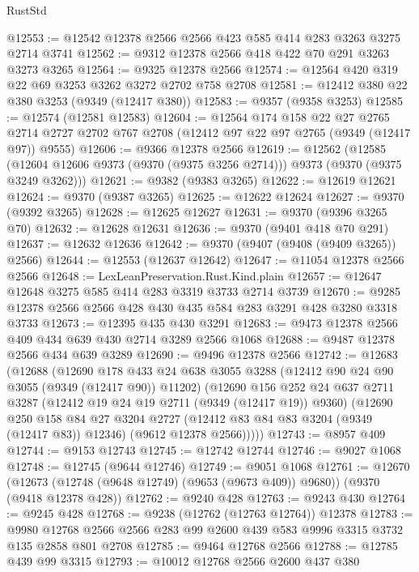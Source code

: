 \begin{lexlean}{RustStd}
\begin{coremodule}
{\begin{coremodule}
{{{{{{{{{{{{{{{{{{{{{{{{{{{{{{{{{{{{{{{@12553 := @12542 @12378 @2566 @2566 @423 @585 @414 @283 @3263 @3275 @2714 @3741
@12562 := @9312 @12378 @2566 @418 @422 @70 @291 @3263 @3273 @3265
@12564 := @9325 @12378 @2566
@12574 := @12564 @420 @319 @22 @69 @3253 @3262 @3272 @2702 @758 @2708
@12581 := @12412 @380 @22 @380 @3253 (@9349 (@12417 @380))
@12583 := @9357 (@9358 @3253)
@12585 := @12574 (@12581 @12583)
@12604 := @12564
    @174
    @158
    @22
    @27
    @2765
    @2714
    @2727
    @2702
    @767
    @2708
    (@12412 @97 @22 @97 @2765 (@9349 (@12417 @97)) @9555)
@12606 := @9366 @12378 @2566
@12619 := @12562
    (@12585 (@12604 @12606 @9373 (@9370 (@9375 @3256 @2714))) @9373 (@9370 (@9375 @3249 @3262)))
@12621 := @9382 (@9383 @3265)
@12622 := @12619 @12621
@12624 := @9370 (@9387 @3265)
@12625 := @12622 @12624
@12627 := @9370 (@9392 @3265)
@12628 := @12625 @12627
@12631 := @9370 (@9396 @3265 @70)
@12632 := @12628 @12631
@12636 := @9370 (@9401 @418 @70 @291)
@12637 := @12632 @12636
@12642 := @9370 (@9407 (@9408 (@9409 @3265)) @2566)
@12644 := @12553 (@12637 @12642)
@12647 := @11054 @12378 @2566 @2566
@12648 := LexLeanPreservation.Rust.Kind.plain
@12657 := @12647 @12648 @3275 @585 @414 @283 @3319 @3733 @2714 @3739
@12670 := @9285 @12378 @2566 @2566 @428 @430 @435 @584 @283 @3291 @428 @3280 @3318 @3733
@12673 := @12395 @435 @430 @3291
@12683 := @9473 @12378 @2566 @409 @434 @639 @430 @2714 @3289 @2566 @1068
@12688 := @9487 @12378 @2566 @434 @639 @3289
@12690 := @9496 @12378 @2566
@12742 := @12683
    (@12688
      (@12690
        @178
        @433
        @24
        @638
        @3055
        @3288
        (@12412 @90 @24 @90 @3055 (@9349 (@12417 @90)) @11202)
        (@12690
          @156
          @252
          @24
          @637
          @2711
          @3287
          (@12412 @19 @24 @19 @2711 (@9349 (@12417 @19)) @9360)
          (@12690
            @250
            @158
            @84
            @27
            @3204
            @2727
            (@12412 @83 @84 @83 @3204 (@9349 (@12417 @83)) @12346)
            (@9612 @12378 @2566)))))
@12743 := @8957 @409
@12744 := @9153 @12743
@12745 := @12742 @12744
@12746 := @9027 @1068
@12748 := @12745 (@9644 @12746)
@12749 := @9051 @1068
@12761 := @12670
    (@12673 (@12748 (@9648 @12749) (@9653 (@9673 @409)) @9680))
    (@9370 (@9418 @12378 @428))
@12762 := @9240 @428
@12763 := @9243 @430
@12764 := @9245 @428
@12768 := @9238 (@12762 (@12763 @12764)) @12378
@12783 := @9980 @12768 @2566 @2566 @283 @99 @2600 @439 @583 @9996 @3315 @3732 @135 @2858 @801 @2708
@12785 := @9464 @12768 @2566
@12788 := @12785 @439 @99 @3315
@12793 := @10012 @12768 @2566 @2600 @437 @380
}}}}}}}}}}}}}}}}}}}}}}}}}}}}}}}}}}}}}}}
\end{coremodule}}
\end{coremodule}
\end{lexlean}
